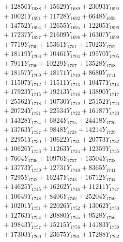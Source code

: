 \documentclass[a4paper,10pt]{article}
\begin{document}
{\begin{align}
&\;  + 12856 Y_{1688} + 15629 Y_{1689} + 23093 Y_{1690} \\[0.3ex]
&\;  + 10021 Y_{1691} + 11728 Y_{1692} + 6648 Y_{1693} \\[0.3ex]
&\;  + 14752 Y_{1694} + 12655 Y_{1695} + 12205 Y_{1696} \\[0.3ex]
&\;  + 17237 Y_{1697} + 21609 Y_{1698} + 16307 Y_{1699} \\[0.3ex]
&\;  + 7719 Y_{1700} + 15361 Y_{1701} + 17023 Y_{1702} \\[0.3ex]
&\;  + 18119 Y_{1703} + 10461 Y_{1704} + 19570 Y_{1705} \\[0.3ex]
&\;  + 7911 Y_{1706} + 10229 Y_{1707} + 13528 Y_{1708} \\[0.5ex]\allowbreak
&\;  + 18157 Y_{1709} + 18171 Y_{1710} + 8680 Y_{1711} \\[0.3ex]
&\;  + 11507 Y_{1712} + 11511 Y_{1713} + 10477 Y_{1714} \\[0.3ex]
&\;  + 17923 Y_{1715} + 19213 Y_{1716} + 13890 Y_{1717} \\[0.3ex]
&\;  + 25562 Y_{1718} + 10730 Y_{1719} + 25152 Y_{1720} \\[0.3ex]
&\;  + 20724 Y_{1721} + 22534 Y_{1722} + 16187 Y_{1723} \\[0.3ex]
&\;  + 14328 Y_{1724} + 6824 Y_{1725} + 24418 Y_{1726} \\[0.3ex]
&\;  + 13763 Y_{1727} + 9848 Y_{1728} + 14214 Y_{1729} \\[0.3ex]
&\;  + 22951 Y_{1730} + 10622 Y_{1731} + 20773 Y_{1732} \\[0.3ex]
&\;  + 10626 Y_{1733} + 11263 Y_{1734} + 12359 Y_{1735} \\[0.3ex]
&\;  + 7604 Y_{1736} + 10976 Y_{1737} + 13504 Y_{1738} \\[0.5ex]\allowbreak
&\;  + 13773 Y_{1739} + 12731 Y_{1740} + 8365 Y_{1741} \\[0.3ex]
&\;  + 7295 Y_{1742} + 16247 Y_{1743} + 16712 Y_{1744} \\[0.3ex]
&\;  + 14625 Y_{1745} + 16262 Y_{1746} + 11211 Y_{1747} \\[0.3ex]
&\;  + 10649 Y_{1748} + 8406 Y_{1749} + 25204 Y_{1750} \\[0.3ex]
&\;  + 10201 Y_{1751} + 22026 Y_{1752} + 13062 Y_{1753} \\[0.3ex]
&\;  + 12763 Y_{1754} + 20880 Y_{1755} + 9528 Y_{1756} \\[0.3ex]
&\;  + 19843 Y_{1757} + 15215 Y_{1758} + 14183 Y_{1759} \\[0.3ex]
&\;  + 17303 Y_{1760} + 23675 Y_{1761} + 17288 Y_{1762} \\[0.3ex]

\end{align}}
\end{document}
